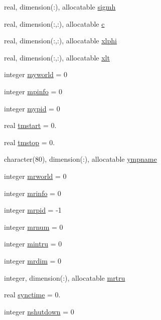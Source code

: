 \begin{DoxyCompactItemize}
\item 
real, dimension(\-:), allocatable \hyperlink{classpumamod_aef4b93fe13f4ff77ca4ad9b9b5245918}{sigmh}
\item 
real, dimension(\-:,\-:), allocatable \hyperlink{classpumamod_a273a105c71e26860f1f83ca28020bbda}{c}
\item 
real, dimension(\-:,\-:), allocatable \hyperlink{classpumamod_a0d93d94e3ecf78ee4c82020b9e1ee95f}{xlphi}
\item 
real, dimension(\-:,\-:), allocatable \hyperlink{classpumamod_a2f42df0a3ac789b2cb6e996a00f16fb4}{xlt}
\item 
integer \hyperlink{classpumamod_af617e09ab068329347fe45e390e46923}{myworld} = 0
\item 
integer \hyperlink{classpumamod_a34212fc920287542d5b665298e229090}{mpinfo} = 0
\item 
integer \hyperlink{classpumamod_abe37e4023fe000a8d7a8f39be8dd8354}{mypid} = 0
\item 
real \hyperlink{classpumamod_ab552a94bc8d5d3e4a56303ac4249b894}{tmstart} = 0.
\item 
real \hyperlink{classpumamod_a6b2cc93bbb820f9aa438282188e75eef}{tmstop} = 0.
\item 
character(80), dimension(\-:), \*
allocatable \hyperlink{classpumamod_a0961a19034b2c5becab0fe77c8e767b6}{ympname}
\item 
integer \hyperlink{classpumamod_afdffea792867b992f5d1d117bea912e9}{mrworld} = 0
\item 
integer \hyperlink{classpumamod_a52d0e34b3a5be19fc3b8d0f11cae3cd2}{mrinfo} = 0
\item 
integer \hyperlink{classpumamod_a7243d78ff49021834f74c4f372747e25}{mrpid} = -\/1
\item 
integer \hyperlink{classpumamod_aca86db6e1c10c1b9517477ce5edbe883}{mrnum} = 0
\item 
integer \hyperlink{classpumamod_af045ac8932ed34ae0d921a49d9696202}{mintru} = 0
\item 
integer \hyperlink{classpumamod_adefb6afc38014b7c141a67f0036bb9fd}{mrdim} = 0
\item 
integer, dimension(\-:), allocatable \hyperlink{classpumamod_a6f3661b2cfef35aad460858a54bac179}{mrtru}
\item 
real \hyperlink{classpumamod_a24c3f399235c4ea5f2d8e1f867f8776d}{synctime} = 0.
\item 
integer \hyperlink{classpumamod_a55d8354fd0488524eb882076f145db4c}{nshutdown} = 0
\item 

\end{DoxyCompactItemize}

